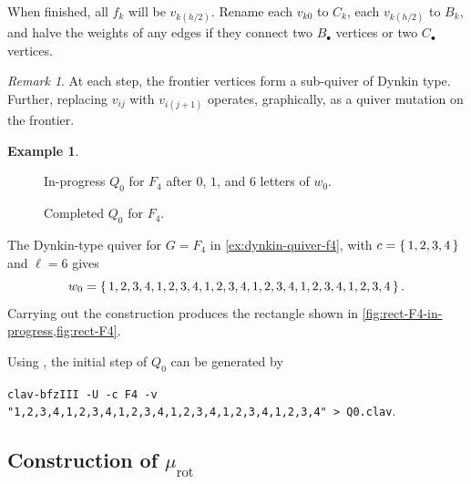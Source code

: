 \documentclass{amsart}
\theoremstyle{plain}
\theoremstyle{definition}
\newtheorem{example}[theorem]{Example}
\theoremstyle{remark}
\newtheorem{remark}[theorem]{Remark}
\newcommand{\murot}{{\mu_{\text{rot}}}}
\begin{document}
  When finished, all $f_k$ will be $v_{k(h/2)}$. Rename each $v_{k0}$ to
  $C_k$, each $v_{k(h/2)}$ to $B_k$, and halve the weights of any edges
  if they connect two $B_{\bullet}$ vertices or two $C_{\bullet}$
  vertices.

  \begin{remark}
    At each step, the frontier vertices form a sub-quiver of Dynkin
    type. Further, replacing $v_{ij}$ with $v_{i(j + 1)}$ operates,
    graphically, as a quiver mutation on the frontier.
  \end{remark}

  \begin{example}
    \label{ex:f4-part-1}
    \begin{figure}[h]
      \centering
      

      \caption{In-progress $Q_0$ for $F_4$ after $0$, $1$, and $6$
        letters of $w_0$.
        \label{fig:rect-F4-in-progress}
      }
    \end{figure}

    \begin{figure}[h]
      \centering 

      \caption{Completed $Q_0$ for $F_4$.
        \label{fig:rect-F4}
      }
    \end{figure}

    The Dynkin-type quiver for $G = F_4$ in \cref{ex:dynkin-quiver-f4},
    with $c = \set{1,2,3,4}$ and $\ell = 6$ gives \[ w_0 = \set{1, 2, 3,
        4, 1, 2, 3, 4, 1, 2, 3, 4, 1, 2, 3, 4, 1, 2, 3, 4, 1, 2, 3, 4}.
    \] Carrying out the construction produces the rectangle shown in
    \cref{fig:rect-F4-in-progress,fig:rect-F4}.

    Using \cite{gilles2019}, the initial step of $Q_0$ can be generated
    by

    {\centering \texttt{clav-bfzIII -U -c F4 -v
        "1,2,3,4,1,2,3,4,1,2,3,4,1,2,3,4,1,2,3,4,1,2,3,4" > Q0.clav}.}
  \end{example}

  \subsection{Construction of \texorpdfstring{$\murot$}{mu\_\{rot\}}}
\end{document}
